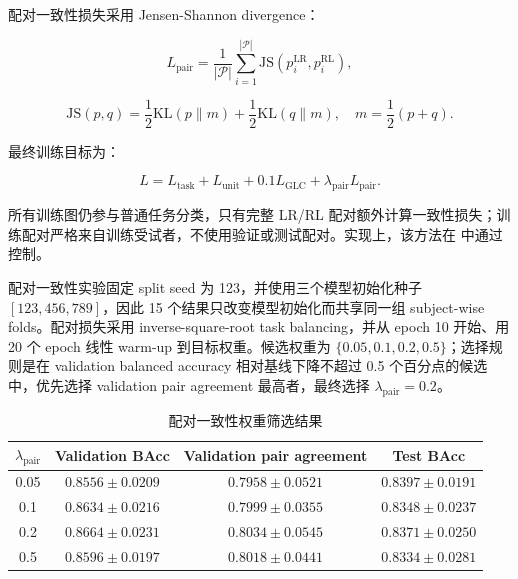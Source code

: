 配对一致性损失采用 Jensen-Shannon divergence：

\begin{equation}
  L_{\mathrm{pair}}
  =
  \frac{1}{|\mathcal{P}|}
  \sum_{i=1}^{|\mathcal{P}|}
  \mathrm{JS}(p_i^{\mathrm{LR}},p_i^{\mathrm{RL}}),
\end{equation}

\begin{equation}
  \mathrm{JS}(p,q)
  =
  \frac{1}{2}\mathrm{KL}(p\|m)
  +
  \frac{1}{2}\mathrm{KL}(q\|m),
  \quad
  m=\frac{1}{2}(p+q).
\end{equation}

最终训练目标为：

\begin{equation}
  L
  = L_{\mathrm{task}} + L_{\mathrm{unit}} + 0.1L_{\mathrm{GLC}}
  + \lambda_{\mathrm{pair}} L_{\mathrm{pair}}.
\end{equation}

所有训练图仍参与普通任务分类，只有完整 LR/RL 配对额外计算一致性损失；训练配对严格来自训练受试者，不使用验证或测试配对。实现上，该方法在  中通过  控制。

配对一致性实验固定 split seed 为 123，并使用三个模型初始化种子 $[123,456,789]$，因此 15 个结果只改变模型初始化而共享同一组 subject-wise folds。配对损失采用 inverse-square-root task balancing，并从 epoch 10 开始、用 20 个 epoch 线性 warm-up 到目标权重。候选权重为 $\{0.05,0.1,0.2,0.5\}$；选择规则是在 validation balanced accuracy 相对基线下降不超过 0.5 个百分点的候选中，优先选择 validation pair agreement 最高者，最终选择 $\lambda_{\mathrm{pair}}=0.2$。

\begin{table}[H]
  \centering
  \caption{配对一致性权重筛选结果}
  \begin{tabular}{cccc}
    \toprule
    $\lambda_{\mathrm{pair}}$ & Validation BAcc & Validation pair agreement & Test BAcc \\
    \midrule
    0.05 & $0.8556 \pm 0.0209$ & $0.7958 \pm 0.0521$ & $0.8397 \pm 0.0191$ \\
    0.1 & $0.8634 \pm 0.0216$ & $0.7999 \pm 0.0355$ & $0.8348 \pm 0.0237$ \\
    0.2 & $\mathbf{0.8664 \pm 0.0231}$ & $\mathbf{0.8034 \pm 0.0545}$ & $0.8371 \pm 0.0250$ \\
    0.5 & $0.8596 \pm 0.0197$ & $0.8018 \pm 0.0441$ & $0.8334 \pm 0.0281$ \\
    \bottomrule
  \end{tabular}
\end{table}

